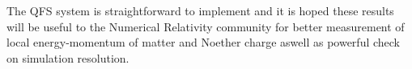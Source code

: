 The QFS system is straightforward to implement and it is hoped these results will be useful to the Numerical Relativity community for better measurement of local energy-momentum of matter and Noether charge aswell as powerful check on simulation resolution.








